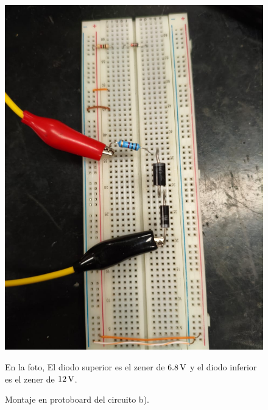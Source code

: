 \documentclass[chaptersright]{informeutn}
\begin{document}
\begin{figure}[H]
    \centering
    \begin{minipage}{0.46\textwidth}
    \centering
    \includegraphics[width=\textwidth]{pictures/circuito_B.jpeg}
    \caption{Montaje en protoboard del circuito b).}
    En la foto, El diodo superior es el zener de $6.8\,\mathrm{V}$ y el diodo inferior es el zener de $12\,\mathrm{V}$.
\end{minipage}
\hspace{0.05\textwidth}
    \begin{minipage}{0.46\textwidth}
    \centering

\end{minipage}
\end{figure}
\end{document}
